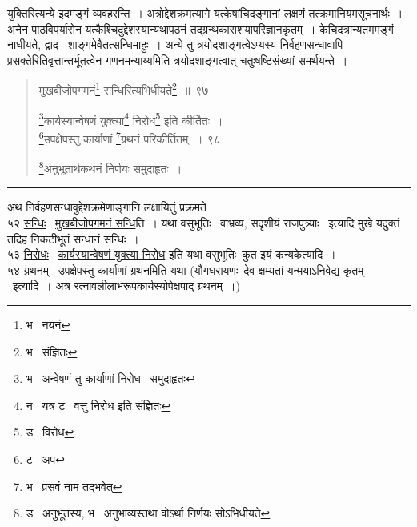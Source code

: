\documentclass[11pt, openany]{book}
\begin{document}
\noindent
युक्तिरित्यन्ये इदमङ्गं व्यवहरन्ति~। अत्रोद्देशक्रमत्यागे यत्केषांचिदङ्गानां लक्षणं तत्क्रमानियमसूचनार्थः~। अनेन पाठविपर्यासेन यत्कैश्चिदुद्देशस्यान्यथापठनं तद्ग्रन्थकाराशयापरिज्ञानकृतम्~। केचिदत्रान्यतममङ्गं नाधीयते, द्वाद \textendash\ शाङ्गमेवैतत्सन्धिमाहुः~। अन्ये तु त्रयोदशाङ्गत्वेऽप्यस्य निर्वहणसन्धावापि प्रसक्तेरितिवृत्तान्तर्भूतत्वेन गणनमन्याय्यमिति त्रयोदशाङ्गत्वात् चतुःषष्टिसंख्यां समर्थयन्ते~।

\newpage

\begin{quote}
{\na मुखबीजोपगमनं\renewcommand{\thefootnote}{1}\footnote{भ \textendash\ नयनं} सन्धिरित्यभिधीयते\renewcommand{\thefootnote}{2}\footnote{भ \textendash\ संज्ञितः}~॥~९७

\renewcommand{\thefootnote}{3}\footnote{भ \textendash\ अन्वेषणं तु कार्याणां निरोध \textendash\ समुदाहृतः}कार्यस्यान्वेषणं युक्त्या\renewcommand{\thefootnote}{4}\footnote{न \textendash\ यत्र ट \textendash\ वत्तु निरोध इति संज्ञितः} निरोध\renewcommand{\thefootnote}{5}\footnote{ड \textendash\ विरोध} इति कीर्तितः~।\\
\renewcommand{\thefootnote}{6}\footnote{ट \textendash\ अप}उपक्षेपस्तु कार्याणां \renewcommand{\thefootnote}{7}\footnote{भ \textendash\ प्रसवं नाम तद्भवेत्}ग्रथनं परिकीर्तितम्~॥~९८

\renewcommand{\thefootnote}{8}\footnote{ड \textendash\ अनुभूतस्य, भ \textendash\ अनुभाव्यस्तथा वोऽर्था निर्णयः सोऽभिधीयते}अनुभूतार्थकथनं निर्णयः समुदाहृतः~।}
\end{quote}

\hrule

\vspace{2mm}
अथ निर्वहणसन्धावुद्देशक्रमेणाङ्गानि लक्षायितुं प्रक्रमते\\

५२ \underline{सन्धिः} \textendash\ \underline{मुखबीजोपगमनं सन्धि}ति~। यथा वसुभूतिः \textendash\ वाभ्रव्य, सदृशीयं राजपुत्र्याः \textendash\ इत्यादि मुखे यदुक्तं तदिह निकटीभूतं सन्धानं सन्धिः~।\\

५३ \underline{निरोधः} \textendash\ \underline{कार्यस्यान्वेषणं युक्त्या निरोध} इति यथा वसुभूतिः\textendash\ कुत इयं कन्यकेत्यादि~।\\

५४ \underline{ग्रथनम्} \textendash\ \underline{उपक्षेपस्तु कार्याणां ग्रथनमि}ति यथा (यौगधरायणः\textendash\ देव क्षम्यतां यन्मयाऽनिवेद्य कृतम् \textendash\ इत्यादि~। अत्र रत्नावलीलाभरूपकार्यस्योपेक्षपाद् ग्रथनम्~।)\\
\end{document}
